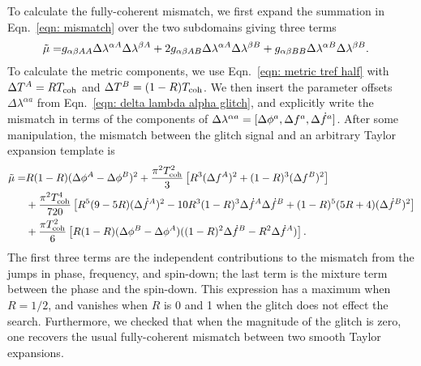 \documentclass[../full_thesis/full_thesis.tex]{subfiles}
\begin{document}
To calculate the fully-coherent mismatch, we first expand
the summation in Eqn.~\eqref{eqn: mismatch} over the two subdomains giving three terms
\begin{align}
\begin{split}
\tilde{\mu} = &
g_{\alpha\beta AA}\Delta\lambda^{\alpha A} \Delta\lambda^{\beta A} +
2 g_{\alpha\beta AB}\Delta\lambda^{\alpha A} \Delta\lambda^{\beta B}
+ g_{\alpha\beta BB}\Delta\lambda^{\alpha B} \Delta\lambda^{\beta B}.
\end{split}
\end{align}
To calculate the metric components, we use Eqn.~\eqref{eqn: metric tref half}
with $\Delta T^A = RT_{\mathrm{coh}}$ and $\Delta T^B = (1-R)T_{\mathrm{coh}}$.
We then insert the parameter offsets $\Delta\lambda^{\alpha a}$
from Eqn.~\eqref{eqn: delta lambda alpha glitch},
and explicitly write the mismatch in terms of the components  of $\Delta\lambda^{\alpha a}=
[\Delta\phi^{a}, \Delta f^{a}, \Delta\dot{f}^{a}]$.
After some manipulation, the mismatch between the glitch signal and an arbitrary
Taylor expansion template is
\begin{align}
\begin{split}
\tilde{\mu} = & R(1-R)(\Delta\phi^A - \Delta\phi^B)^{2}
+ \frac{\pi^{2}T_{\mathrm{coh}}^{2}}{3}
\left[R^{3}(\Delta f^A)^{2} + (1-R)^{3}  (\Delta f^B)^{2}\right] \\
& + \frac{\pi^{2} T_{\mathrm{coh}}^{4}}{720}\left[
       R^{5}(9-5R)(\Delta\dot{f}^A)^{2}
       -10R^{3}(1-R)^{3}\Delta\dot{f}^A\Delta\dot{f}^B
       + (1-R)^{5}(5R+4)(\Delta\dot{f}^B)^{2}
                                       \right] \\
& + \frac{\pi T_{\mathrm{coh}}^{2}}{6}\left[R(1-R)
    (\Delta\phi^B - \Delta\phi^A)
    ((1-R)^{2}\Delta\dot{f}^B -  R^{2}\Delta\dot{f}^A)
                                 \right].
\end{split}
\label{eqn: mutilde fully-coherent unminimised}
\end{align}
The first three terms are the independent contributions to the
mismatch from the jumps in phase, frequency, and spin-down; the last term is the mixture
term between the phase and the spin-down.  This expression has a maximum
when $R = 1/2$, and vanishes when $R$ is 0 and 1 when the glitch does not effect the
search. Furthermore, we checked that when the magnitude of the glitch is zero,
one recovers the usual fully-coherent mismatch between two smooth Taylor expansions.
\end{document}
